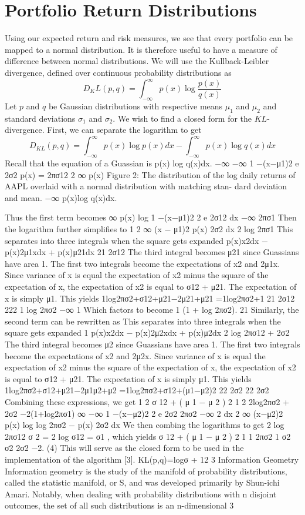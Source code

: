 \documentclass{article}
\begin{document}
\section{Portfolio Return Distributions}
Using our expected return and risk measures, we see that every portfolio can be mapped to a normal distribution. It is therefore useful to have a measure of difference between normal distributions. We will use the Kullback-Leibler divergence, defined over continuous probability distributions as
\[D_KL(p,q) = \int_{-\infty}^\infty p(x) \log\frac{p(x)}{q(x)}\]
Let $p$ and $q$ be Gaussian distributions with respective means $\mu_1$ and $\mu_2$ and standard deviations $\sigma_1$ and $\sigma_2$. We wish to find a closed form for the $KL$-divergence. First, we can separate the logarithm to get
\[D_{KL}(p, q) = \int_{-\infty}^{\infty} p(x) \log p(x)dx − \int_{-\infty}^{\infty} p(x) \log q(x)dx\]
Recall that the equation of a Guassian is
p(x) log q(x)dx.
−∞
−∞
1 −(x−μ1)2
e 2σ2
p(x) =  
2πσ12 2
 ∞ p(x)
Figure 2: The distribution of the log daily returns of AAPL overlaid with a normal distribution with matching stan- dard deviation and mean.
 −∞
p(x)log q(x)dx.
   
Thus the first term becomes
 ∞
p(x) log  
1 −(x−μ1)2 2 e 2σ12
dx
   −∞ 2πσ1 Then the logarithm further simplifies to
1 2   ∞
(x − μ1)2 p(x) 2σ2 dx
2 log 2πσ1
This separates into three integrals when the square gets expanded
  p(x)x2dx −   p(x)2μ1xdx +   p(x)μ21dx 21 2σ12
The third integral becomes μ21 since Guassians have area 1. The first two integrals become the expectations of x2 and 2μ1x. Since variance of x is equal the expectation of x2 minus the square of the expectation of x, the expectation of x2 is equal to σ12 + μ21. The expectation of x is simply μ1. This yields
1log2πσ2+σ12+μ21−2μ21+μ21 =1log2πσ2+1 21 2σ12 222
  1
log 2πσ2
−∞ 1
      Which factors to become 1 (1 + log 2πσ2). 21
Similarly, the second term can be rewritten as
This separates into three integrals when the square gets expanded
1   p(x)x2dx −   p(x)2μ2xdx +   p(x)μ2dx 2 log 2πσ12 + 2σ2
The third integral becomes μ2 since Guassians have area 1. The first two integrals become the expectations of x2 and 2μ2x. Since variance of x is equal the expectation of x2 minus the square of the expectation of x, the expectation of x2 is equal to σ12 + μ21. The expectation of x is simply μ1. This yields
1log2πσ2+σ12+μ21−2μ1μ2+μ2 =1log2πσ2+σ12+(μ1−μ2)2 22 2σ2 22 2σ2
Combining these expressions, we get
1 2 σ 12 + ( μ 1 − μ 2 ) 2 1 2 2log2πσ2 + 2σ2 −2(1+log2πσ1)
  ∞ −∞
1 −(x−μ2)2 2 e 2σ2
2πσ2
−∞ 2
 dx   2  ∞ (x−μ2)2
p(x) log  
log 2πσ2 − p(x) 2σ2 dx
             We then combing the logarithms to get 2 log 2πσ12 σ 2
= 2 log σ12 = σ1 , which yields σ 12 + ( μ 1 − μ 2 ) 2 1
1 2πσ2 1 σ2 σ2
     2σ2 −2. (4) This will serve as the closed form to be used in the implementation of the algorithm [3].
KL(p,q)=logσ + 12
   3 Information Geometry
Information geometry is the study of the manifold of probability distributions, called the statistic manifold, or S, and was developed primarily by Shun-ichi Amari. Notably, when dealing with probability distributions with n disjoint outcomes, the set of all such distributions is an n-dimensional
3
\end{document}
